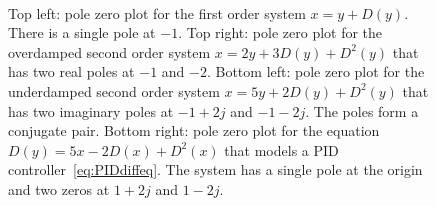 \documentclass[11pt,a4paper]{book}
\theoremstyle{plain}
\numberwithin{equation}{section}
\renewcommand{\Re}{\operatorname{Re}}
\renewcommand{\Im}{\operatorname{Im}}
\newcommand{\term}{\textbf}
\newcommand{\abs}[1]{\left\vert #1 \right\vert}
\newcommand{\polezeroaxis}[1]{   
  \draw [<->] (-#1,0) -- (#1,0) node [above left]  {$\Re$};
  \draw [<->] (0,-#1) -- (0,#1) node [below right] {$\Im$};
 }
\newcommand{\zerotikz}[2]{ \node[draw,thick,circle,inner sep=1.75pt] at (#1,#2) {}; }
\newcommand{\poletikz}[2]{
  \draw[thick] (#1-0.08,#2-0.08) -- (#1+0.08,#2+0.08);
  \draw[thick] (#1-0.08,#2+0.08) -- (#1+0.08,#2-0.08);
}
\newcommand{\vtick}[1]{\draw (#1,-0.075) -- (#1,0.075) }
\newcommand{\htick}[1]{\draw (-0.075,#1) -- (0.075,#1)}
\begin{document}
\begin{figure}[tp]
  \centering
  \;\;\;
  \\ \vspace{0.3cm}
  \;\;\;
  \caption{Top left: pole zero plot for the first order system $x = y + D(y)$.  There is a single pole at $-1$. Top right: pole zero plot for the overdamped second order system $x = 2y + 3D(y) + D^2(y)$ that has two real poles at $-1$ and $-2$. Bottom left: pole zero plot for the underdamped second order system $x = 5y + 2 D(y) + D^2(y)$ that has two imaginary poles at $-1+2j$ and $-1-2j$.  The poles form a conjugate pair.  Bottom right: pole zero plot for the equation $D(y) =  5 x - 2 D(x) + D^2(x)$ that models a PID controller~\eqref{eq:PIDdiffeq}.  The system has a single pole at the origin and two zeros at $1+2j$ and $1-2j$. }\label{fig:polezeroplot}
\end{figure}

\end{document}
